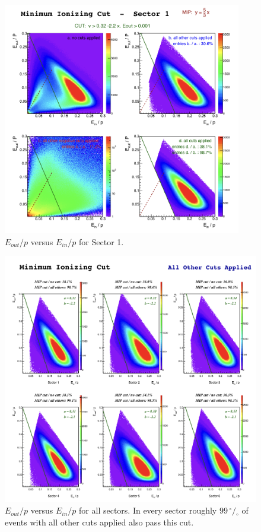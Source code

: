 \begin{figure}[ht]
  \centering
		\includegraphics[width=0.93\textwidth]{img/cut-10EoVsEi_sector-1.png}
		\caption{$E_{out}/p$ versus $E_{in}/p$ for Sector 1.}
 		\label{fig:EoEi}
\end{figure}


\clearpage\newpage
\begin{figure}[ht]
  \centering
		\includegraphics[width=1.00\textwidth]{img/cut-10EoVsEi_sector-all.png}
		\caption{$E_{out}/p$ versus $E_{in}/p$ for all sectors. In every sector
					roughly $99\,^{\circ\!\!}/\!_\circ$ of events with all other cuts applied also pass this cut. }
 		\label{fig:EoEi_all}
\end{figure}

